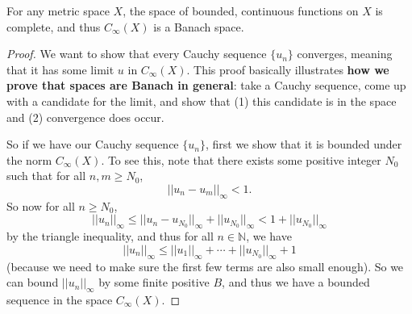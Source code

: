 \begin{theorem}
For any metric space $X$, the space of bounded, continuous functions on $X$ is complete, and thus $C_{\infty}(X)$ is a Banach space.
\end{theorem}
\begin{proof}
We want to show that every Cauchy sequence $\{u_n\}$ converges, meaning that it has some limit $u$ in $C_{\infty}(X)$. This proof basically illustrates \textbf{how we prove that spaces are Banach in general}: take a Cauchy sequence, come up with a candidate for the limit, and show that (1) this candidate is in the space and (2) convergence does occur.

So if we have our Cauchy sequence $\{u_n\}$, first we show that it is bounded under the norm $C_{\infty}(X)$. To see this, note that there exists some positive integer $N_0$ such that for all $n, m \ge N_0$, 
\[
    ||u_n-u_m||_{\infty} < 1.
\]
So now for all $n \ge N_0$,
\[
    ||u_n||_{\infty} \le ||u_n - u_{N_0}||_{\infty} + ||u_{N_0}||_{\infty} < 1 + ||u_{N_0}||_{\infty}
\]
by the triangle inequality, and thus for all $n \in \mathbb{N}$, we have
\[
    ||u_n||_{\infty} \le ||u_1||_{\infty} + \cdots + ||u_{N_0}||_{\infty} + 1
\]
(because we need to make sure the first few terms are also small enough). So we can bound $||u_n||_{\infty}$ by some finite positive $B$, and thus we have a bounded sequence in the space $C_{\infty}(X)$.


\end{proof}
